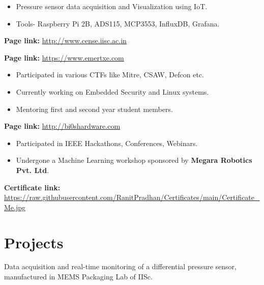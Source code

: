 \documentclass[11pt,a4paper,sans]{moderncv}        %
\begin{document}
{\begin{itemize}
\item Pressure sensor data acquisition and Visualization using IoT.
\item Tools- Raspberry Pi 2B, ADS115, MCP3553, InfluxDB, Grafana.
\end{itemize}
\textbf{Page link:}
\url{http://www.cense.iisc.ac.in}}

{
\textbf{Page link:}
\url{https://www.emertxe.com}}

{\begin{itemize}
\item Participated in various CTFs like Mitre, CSAW, Defcon etc.
\item Currently working on Embedded Security and Linux systems.
\item Mentoring first and second year student members.
\end{itemize}
\textbf{Page link:}
\url{http://bi0shardware.com}}

{\begin{itemize}
\item Participated in IEEE Hackathons, Conferences, Webinars.
\item Undergone a Machine Learning workshop sponsored by \textbf {Megara Robotics Pvt. Ltd}.
\end{itemize}
\textbf{Certificate link:}
\url{https://raw.githubusercontent.com/RanitPradhan/Certificates/main/Certificate_Me.jpg}}


\pagebreak

\section{Projects}
{Data acquisition and real-time monitoring of a differential pressure sensor, manufactured in MEMS Packaging Lab of IISc. 
}
\end{document}
